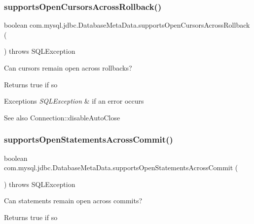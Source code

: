 \subsubsection{\texorpdfstring{supports\+Open\+Cursors\+Across\+Rollback()}{supportsOpenCursorsAcrossRollback()}}
{\footnotesize\ttfamily boolean com.\+mysql.\+jdbc.\+Database\+Meta\+Data.\+supports\+Open\+Cursors\+Across\+Rollback (\begin{DoxyParamCaption}{ }\end{DoxyParamCaption}) throws S\+Q\+L\+Exception}

Can cursors remain open across rollbacks?

\begin{DoxyReturn}{Returns}
true if so 
\end{DoxyReturn}

\begin{DoxyExceptions}{Exceptions}
{\em S\+Q\+L\+Exception} & if an error occurs \\
\hline
\end{DoxyExceptions}
\begin{DoxySeeAlso}{See also}
Connection\+::disable\+Auto\+Close 
\end{DoxySeeAlso}
\mbox{\label{classcom_1_1mysql_1_1jdbc_1_1_database_meta_data_a6faae6d0fa4fab6a8cf65542804a4e24}} 
\subsubsection{\texorpdfstring{supports\+Open\+Statements\+Across\+Commit()}{supportsOpenStatementsAcrossCommit()}}
{\footnotesize\ttfamily boolean com.\+mysql.\+jdbc.\+Database\+Meta\+Data.\+supports\+Open\+Statements\+Across\+Commit (\begin{DoxyParamCaption}{ }\end{DoxyParamCaption}) throws S\+Q\+L\+Exception}

Can statements remain open across commits?

\begin{DoxyReturn}{Returns}
true if so 
\end{DoxyReturn}

